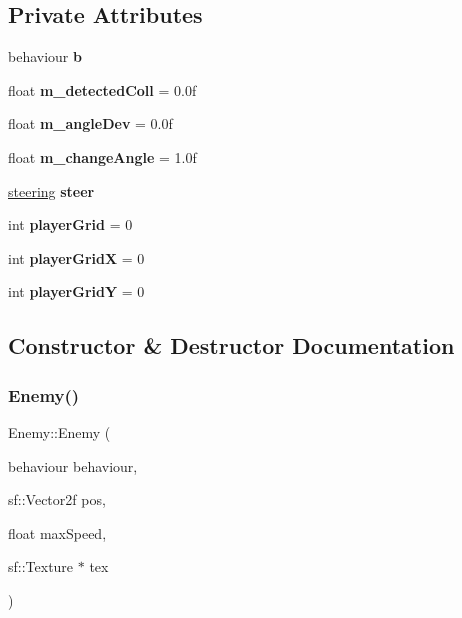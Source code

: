 \subsection*{Private Attributes}
\begin{DoxyCompactItemize}
\item 
\mbox{\label{class_enemy_aae7281dd7b929738cb90cd96402d5b9f}} 
behaviour {\bfseries b}
\item 
\mbox{\label{class_enemy_af1b2e2903e4b0db8eda8efab9667f726}} 
float {\bfseries m\+\_\+detected\+Coll} = 0.\+0f
\item 
\mbox{\label{class_enemy_aa50cae12312ba44306c6742c5bcd92a6}} 
float {\bfseries m\+\_\+angle\+Dev} = 0.\+0f
\item 
\mbox{\label{class_enemy_a4db6c22a5f49737562fa7656d9191b35}} 
float {\bfseries m\+\_\+change\+Angle} = 1.\+0f
\item 
\mbox{\label{class_enemy_a8dfa4dc17d6716d1f8888595f3fdbeb3}} 
\mbox{\hyperlink{structsteering}{steering}} {\bfseries steer}
\item 
\mbox{\label{class_enemy_a06977e280c6f0b00bee48152ab89a4dc}} 
int {\bfseries player\+Grid} = 0
\item 
\mbox{\label{class_enemy_ae9af61decd4594972b6cad1249b60d55}} 
int {\bfseries player\+GridX} = 0
\item 
\mbox{\label{class_enemy_afe88cfda39b49d94fca0b3c24222132d}} 
int {\bfseries player\+GridY} = 0
\end{DoxyCompactItemize}


\subsection{Constructor \& Destructor Documentation}
\mbox{\label{class_enemy_ae98e4e8aeb959fa33b2f956b116fbae3}} 
\subsubsection{\texorpdfstring{Enemy()}{Enemy()}}
{\footnotesize\ttfamily Enemy\+::\+Enemy (\begin{DoxyParamCaption}\item[{behaviour}]{behaviour,  }\item[{sf\+::\+Vector2f}]{pos,  }\item[{float}]{max\+Speed,  }\item[{sf\+::\+Texture $\ast$}]{tex }\end{DoxyParamCaption})}



